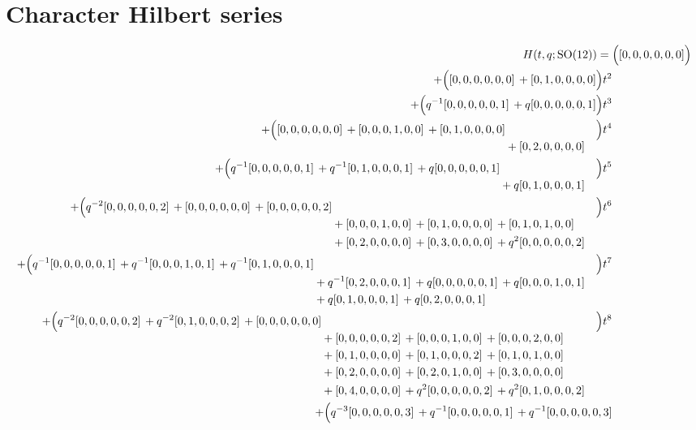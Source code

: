 \documentclass[10pt]{article}
\begin{document}
\section{Character Hilbert series}
\[
\begin{aligned}
H(t,q;\mathrm{SO}(12)) ={}&
   \Bigl([0,0,0,0,0,0]\Bigr) \\
  + \Bigl([0,0,0,0,0,0]\,+[0,1,0,0,0,0]\Bigr)t^{2} \\
  + \Bigl(q^{-1}[0,0,0,0,0,1]\,+q[0,0,0,0,0,1]\Bigr)t^{3} \\
  + \Bigl(\begin{aligned}[t][0,0,0,0,0,0]\,+[0,0,0,1,0,0]\,+[0,1,0,0,0,0] \\
  &{}+[0,2,0,0,0,0]\end{aligned}\Bigr)t^{4} \\
  + \Bigl(\begin{aligned}[t]q^{-1}[0,0,0,0,0,1]\,+q^{-1}[0,1,0,0,0,1]\,+q[0,0,0,0,0,1] \\
  &{}+q[0,1,0,0,0,1]\end{aligned}\Bigr)t^{5} \\
  + \Bigl(\begin{aligned}[t]q^{-2}[0,0,0,0,0,2]\,+[0,0,0,0,0,0]\,+[0,0,0,0,0,2] \\
  &{}+[0,0,0,1,0,0]\,+[0,1,0,0,0,0]\,+[0,1,0,1,0,0] \\
  &{}+[0,2,0,0,0,0]\,+[0,3,0,0,0,0]\,+q^{2}[0,0,0,0,0,2]\end{aligned}\Bigr)t^{6} \\
  + \Bigl(\begin{aligned}[t]q^{-1}[0,0,0,0,0,1]\,+q^{-1}[0,0,0,1,0,1]\,+q^{-1}[0,1,0,0,0,1] \\
  &{}+q^{-1}[0,2,0,0,0,1]\,+q[0,0,0,0,0,1]\,+q[0,0,0,1,0,1] \\
  &{}+q[0,1,0,0,0,1]\,+q[0,2,0,0,0,1]\end{aligned}\Bigr)t^{7} \\
  + \Bigl(\begin{aligned}[t]q^{-2}[0,0,0,0,0,2]\,+q^{-2}[0,1,0,0,0,2]\,+[0,0,0,0,0,0] \\
  &{}+[0,0,0,0,0,2]\,+[0,0,0,1,0,0]\,+[0,0,0,2,0,0] \\
  &{}+[0,1,0,0,0,0]\,+[0,1,0,0,0,2]\,+[0,1,0,1,0,0] \\
  &{}+[0,2,0,0,0,0]\,+[0,2,0,1,0,0]\,+[0,3,0,0,0,0] \\
  &{}+[0,4,0,0,0,0]\,+q^{2}[0,0,0,0,0,2]\,+q^{2}[0,1,0,0,0,2]\end{aligned}\Bigr)t^{8} \\
  + \Bigl(\begin{aligned}[t]q^{-3}[0,0,0,0,0,3]\,+q^{-1}[0,0,0,0,0,1]\,+q^{-1}[0,0,0,0,0,3] \\

\end{aligned}
\end{aligned}\]
\end{document}
